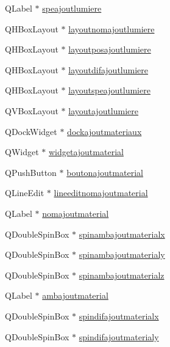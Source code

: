 \begin{DoxyCompactItemize}
\item 
Q\+Label $\ast$ \hyperlink{class_main_window_a549c42dd7554a4414ca34fc253457889}{speajoutlumiere}
\item 
Q\+H\+Box\+Layout $\ast$ \hyperlink{class_main_window_a0cffcdf1b642b23f05b7ed78beaeb066}{layoutnomajoutlumiere}
\item 
Q\+H\+Box\+Layout $\ast$ \hyperlink{class_main_window_a0afe930901084cdb5835537298d77219}{layoutposajoutlumiere}
\item 
Q\+H\+Box\+Layout $\ast$ \hyperlink{class_main_window_a8ce502c6bd1f174f2e13d491f0797056}{layoutdifajoutlumiere}
\item 
Q\+H\+Box\+Layout $\ast$ \hyperlink{class_main_window_a31b82741cd4c48d8e3b85981173fd1ad}{layoutspeajoutlumiere}
\item 
Q\+V\+Box\+Layout $\ast$ \hyperlink{class_main_window_ab54462c9ca68986b780c8fb83300336c}{layoutajoutlumiere}
\item 
Q\+Dock\+Widget $\ast$ \hyperlink{class_main_window_a033d7bd189e33389081c3352c3b41021}{dockajoutmateriaux}
\item 
Q\+Widget $\ast$ \hyperlink{class_main_window_a071e7995e629a7b42ddbc5f54eae7dd3}{widgetajoutmaterial}
\item 
Q\+Push\+Button $\ast$ \hyperlink{class_main_window_a9d0608c267dd8f7898df41de4dda0be1}{boutonajoutmaterial}
\item 
Q\+Line\+Edit $\ast$ \hyperlink{class_main_window_a9f41187b00dba6b31cc4411bdc3e673b}{lineeditnomajoutmaterial}
\item 
Q\+Label $\ast$ \hyperlink{class_main_window_ae0e05e579231d8e870d07ba9e4ae7223}{nomajoutmaterial}
\item 
Q\+Double\+Spin\+Box $\ast$ \hyperlink{class_main_window_a307a29066af1090776251ddc1e067388}{spinambajoutmaterialx}
\item 
Q\+Double\+Spin\+Box $\ast$ \hyperlink{class_main_window_a5f6a9da53b2ff428ff4ebf5ec4d469ff}{spinambajoutmaterialy}
\item 
Q\+Double\+Spin\+Box $\ast$ \hyperlink{class_main_window_a6969ed6db37482077ffe51c2b00a4b82}{spinambajoutmaterialz}
\item 
Q\+Label $\ast$ \hyperlink{class_main_window_aea5950c7b756106a6a68c766352676bb}{ambajoutmaterial}
\item 
Q\+Double\+Spin\+Box $\ast$ \hyperlink{class_main_window_a350c852e60398b5e1d8923666a19f4a8}{spindifajoutmaterialx}
\item 
Q\+Double\+Spin\+Box $\ast$ \hyperlink{class_main_window_ac8938b333422d475686212a6da6f8592}{spindifajoutmaterialy}

\end{DoxyCompactItemize}
